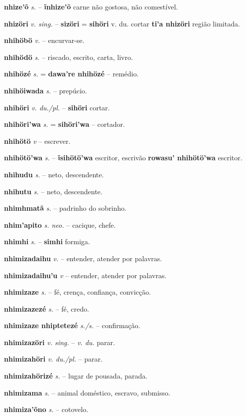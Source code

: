 \textbf{nhize'õ} \textit{s.} -- \textbf{ĩnhize'õ} carne não gostosa, não comestível.

\textbf{nhizöri} \textit{v. sing.} -- \textbf{sizöri} = \textbf{sihöri} v. du. cortar  \textbf{ti'a nhizöri} região limitada.

\textbf{nhihöbö} \textit{v.} -- encurvar-se.

\textbf{nhihödö} \textit{s.} -- riscado, escrito, carta, livro.

\textbf{nhihözé} \textit{s.} = \textbf{dawa're nhihözé} -- remédio.

\textbf{nhihöiwada} \textit{s.} -- prepúcio.

\textbf{nhihöri} \textit{v. du./pl.} -- \textbf{sihöri} cortar.

\textbf{nhihöri'wa} \textit{s.} = \textbf{sihöri'wa} -- cortador.

\textbf{nhihötö} \textit{v} -- escrever.

\textbf{nhihötö'wa} \textit{s.} -- \textbf{ĩsihötö'wa} escritor, escrivão  \textbf{rowasu' nhihötö'wa} escritor.

\textbf{nhihudu} \textit{s.} -- neto, descendente.

\textbf{nhihutu} \textit{s.} -- neto, descendente.

\textbf{nhimhmatã} \textit{s.} -- padrinho do sobrinho.

\textbf{nhim'apito} \textit{s. neo.} -- cacique, chefe.

\textbf{nhimhi} \textit{s.} -- \textbf{simhi} formiga.

\textbf{nhimizadaihu} \textit{v.} -- entender, atender por palavras.

\textbf{nhimizadaihu'u} \textit{v} -- entender, atender por palavras.

\textbf{nhimizaze} \textit{s.} -- fé, crença, confiança, convicção.

\textbf{nhimizazezé} \textit{s.} -- fé, credo.

\textbf{nhimizaze nhiptetezé} \textit{s./s.} -- confirmação.

\textbf{nhimizazöri} \textit{v. sing.} -- \textit{v. du.} parar.

\textbf{nhimizahöri} \textit{v. du./pl.} -- parar.

\textbf{nhimizahörizé} \textit{s.} -- lugar de pousada, parada.

\textbf{nhimizama} \textit{s.} -- animal doméstico, escravo, submisso.

\textbf{nhimiza'õno} \textit{s.} -- cotovelo.

